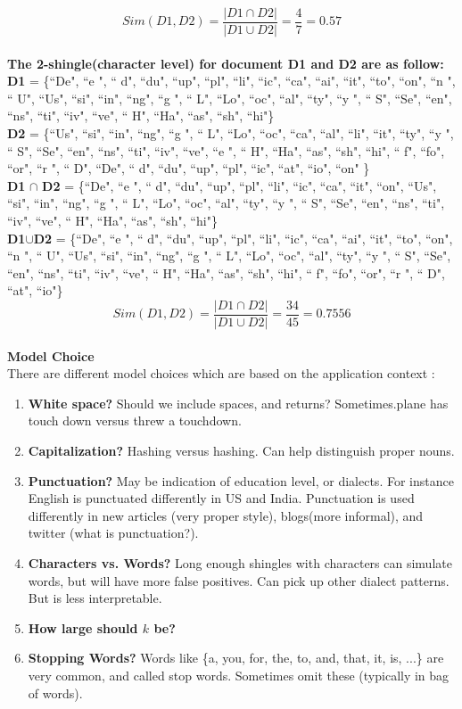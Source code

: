 \documentclass[12pt, a4paper,twoside]{article}
\begin{document}
 $$Sim(D1 , D2) = \frac{| D1 \cap D2|}{|D1 \cup D2|} = \frac{4}{7} = 0.57$$ \\
\textbf{The 2-shingle(character level)  for document D1 and D2 are as follow:} \\
\textbf{D1} = \{``De", ``e ", `` d", ``du", ``up", ``pl", ``li", ``ic", ``ca", ``ai", ``it", ``to", ``on", ``n ", `` U", ``Us", ``si", ``in", ``ng", ``g ", `` L", ``Lo", ``oc", ``al", ``ty", ``y ", `` S", ``Se", ``en", ``ns", ``ti", ``iv", ``ve", `` H", ``Ha", ``as",	``sh", ``hi"\} \\
\textbf{D2}  = \{``Us", ``si", ``in", ``ng", ``g ", `` L", ``Lo", ``oc", ``ca", ``al", ``li", ``it", ``ty", ``y ", `` S", ``Se", ``en", ``ns", ``ti", ``iv", ``ve", ``e ", `` H", ``Ha", ``as", ``sh", ``hi", `` f", ``fo", ``or", ``r ", `` D", ``De", `` d", ``du", ``up", ``pl", ``ic", ``at", ``io", ``on" \}  \\
\textbf{D1} $\bm{\cap}$ \textbf{D2} =  \{``De", ``e ", `` d", ``du", ``up", ``pl", ``li", ``ic", ``ca", ``it", ``on", ``Us", ``si", ``in", ``ng", ``g ", `` L", ``Lo", ``oc", ``al", ``ty", ``y ", `` S", ``Se", ``en", ``ns", ``ti", ``iv", ``ve", `` H", ``Ha", ``as", ``sh", ``hi"\} \\
\textbf{D1}$\bm{\cup}$\textbf{D2} = \{``De", ``e ", `` d", ``du", ``up", ``pl", ``li", ``ic", ``ca", ``ai", ``it", ``to", ``on", ``n ", `` U", ``Us",	``si", ``in", ``ng", ``g ", `` L", ``Lo", ``oc", ``al", ``ty", ``y ", `` S", ``Se", ``en", ``ns", ``ti", ``iv", ``ve", `` H", ``Ha", ``as", ``sh", ``hi", `` f", ``fo", ``or", ``r ", `` D", ``at", ``io"\} \\
 
$$Sim(D1 , D2) = \frac{|D1 \cap D2|}{|D1 \cup D2|} = \frac{34}{45} = 0.7556$$ \\

\textbf{Model Choice}\\
There are different model choices which are based on the application context :
\begin{enumerate}
	\item \textbf{White space?} Should we include spaces, and returns?  Sometimes.plane has touch down versus threw a touchdown.
	\item \textbf{Capitalization?} Hashing versus hashing. Can help distinguish proper nouns.
	\item \textbf{Punctuation?} May be indication of education level, or dialects.  For instance English is punctuated differently in US and India.  Punctuation is used differently in new articles (very proper style), blogs(more informal), and twitter (what is punctuation?).
	\item \textbf{Characters vs. Words?} Long enough shingles with characters can simulate words, but will have more false positives. Can pick up other dialect patterns. But is less interpretable.
	\item \textbf{How large should  $k$ be?}
	\item \textbf{Stopping Words?} Words like \{a, you, for, the, to, and, that, it, is, ...\} are very common, and called stop words.  Sometimes omit these (typically in bag of words).
\end{enumerate}
\end{document}
